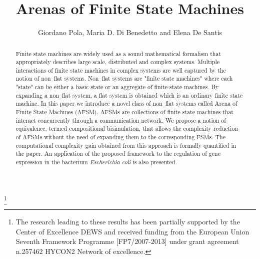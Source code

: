 \documentclass{amsart}
\theoremstyle{definition}
\theoremstyle{remark}
\numberwithin{equation}{section}
\begin{document}
\begin{abstract}                          Finite state machines are widely used as a sound mathematical formalism that appropriately describes large scale, distributed and complex systems. 
Multiple interactions of finite state machines in complex systems are well captured by the notion of non--flat systems. Non--flat systems are "finite state machines" where each "state" can be either a basic state or an aggregate of finite state machines. 
By expanding a non--flat system, a flat system is obtained which is an ordinary finite state machine. 
In this paper we introduce a novel class of non--flat systems called Arena of Finite State Machines (AFSM). AFSMs are collections of finite state machines that interact concurrently through a communication network. We propose a notion of equivalence, termed compositional bisimulation, that allows the complexity reduction of AFSMs without the need of expanding them to the corresponding FSMs. The computational complexity gain obtained from this approach is formally quantified in the paper. An application of the proposed framework to the regulation of gene expression in the bacterium \textit{Escherichia coli} is also presented.
\end{abstract}

\title[Arenas of Finite State Machines]{Arenas of Finite State Machines}
\thanks{The research leading to these results has been partially supported by the Center of Excellence DEWS and received funding from the European Union Seventh Framework Programme [FP7/2007-2013] under grant agreement n.257462 HYCON2 Network of excellence.}

\author[Giordano Pola, Maria D. Di Benedetto and Elena De Santis]{
Giordano Pola, Maria D. Di Benedetto and Elena De Santis}
\address{
Department of Electrical and Information Engineering, Center of Excellence DEWS,
University of L{'}Aquila, Poggio di Roio, 67040 L{'}Aquila, Italy}

\maketitle
\end{document}
